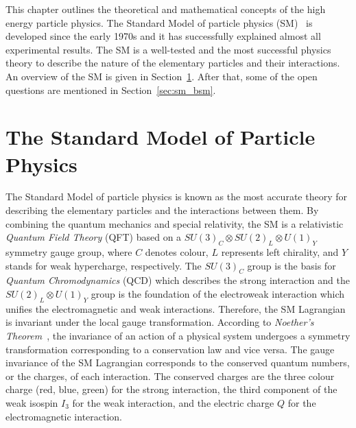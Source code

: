 This chapter outlines the theoretical and mathematical concepts of the high energy particle physics.
The Standard Model of particle physics (SM)~\cite{Salam:1968rm, Glashow:1961tr, Weinberg:1967tq, Herrero:1998eq, Cottingham:2007zz} is developed since the early 1970s and it has successfully explained almost all experimental results.
The SM is a well-tested and the most successful physics theory to describe the nature of the elementary particles and their interactions.
An overview of the SM is given in Section~\ref{sec:sm}.
After that, some of the open questions are mentioned in Section~\ref{sec:sm_bsm}.


\section{The Standard Model of Particle Physics}
\label{sec:sm}
The Standard Model of particle physics is known as the most accurate theory for describing the elementary particles and the interactions between them.
By combining the quantum mechanics and special relativity, the SM is a relativistic \textit{Quantum Field Theory} (QFT) based on a $SU(3)_{C} \otimes SU(2)_{L} \otimes U(1)_{Y}$ symmetry gauge group, where $C$ denotes colour, $L$ represents left chirality, and $Y$ stands for weak hypercharge, respectively.
The $SU(3)_{C}$ group is the basis for \textit{Quantum Chromodynamics} (QCD) which describes the strong interaction and the $SU(2)_{L} \otimes U(1)_{Y}$ group is the foundation of the electroweak interaction which unifies the electromagnetic and weak interactions.
Therefore, the SM Lagrangian is invariant under the local gauge transformation.
According to \textit{Noether's Theorem}~\cite{Noether:1918zz}, the invariance of an action of a physical system undergoes a symmetry transformation corresponding to a conservation law and vice versa. 
The gauge invariance of the SM Lagrangian corresponds to the conserved quantum numbers, or the charges, of each interaction.
The conserved charges are the three colour charge (red, blue, green) for the strong interaction, the third component of the weak isospin $I_{3}$ for the weak interaction, and the electric charge $Q$ for the electromagnetic interaction.


